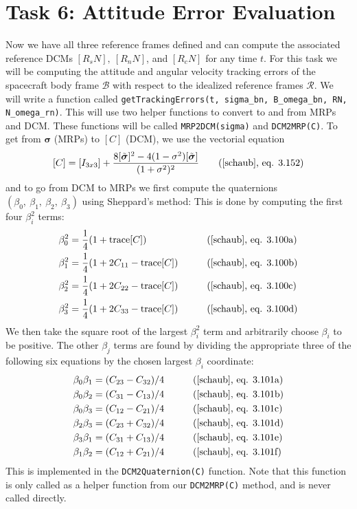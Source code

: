 \documentclass[conf]{new-aiaa}
\begin{document}
\section{Task 6: Attitude Error Evaluation}
Now we have all three reference frames defined and can compute the associated reference DCMs $[R_sN],\ [R_nN]$, and $[R_cN]$ for any time $t$. For this task we will be computing the attitude and angular velocity tracking errors of the spacecraft body frame $\mathcal{B}$ with respect to the idealized reference frames $\mathcal{R}$.
We will write a function called \texttt{getTrackingErrors(t, sigma\_bn, B\_omega\_bn, RN, N\_omega\_rn)}. This will use two helper functions to convert to and from MRPs and DCM. These functions will be called \texttt{MRP2DCM(sigma)} and \texttt{DCM2MRP(C)}. To get from $\bm{\sigma}$ (MRPs) to $[C]$ (DCM), we use the vectorial equation
\[
[C]= [I_{3x3}] + \frac{8[\tilde{\bm{\sigma}}]^2-4(1-\sigma^2)[\tilde{\bm{\sigma}}]}{(1+\sigma^2)^2}
\tag{\cite{schaub},~eq. 3.152}\]
and to go from DCM to MRPs we first compute the quaternions $(\beta_0,\ \beta_1,\ \beta_2,\ \beta_3)$ using Sheppard's method: This is done by computing the first four $\beta_i^2$ terms:
\begin{align}
\beta_0^2 &= \frac{1}{4}(1+\text{trace}[C]) && \tag{\cite{schaub},~eq. 3.100a} \\
\beta_1^2 &= \frac{1}{4}(1+2C_{11}-\text{trace}[C]) && \tag{\cite{schaub},~eq. 3.100b} \\
\beta_2^2 &= \frac{1}{4}(1+2C_{22}-\text{trace}[C]) && \tag{\cite{schaub},~eq. 3.100c} \\
\beta_3^2 &= \frac{1}{4}(1+2C_{33}-\text{trace}[C]) && \tag{\cite{schaub},~eq. 3.100d}
\end{align}
We then take the square root of the largest $\beta_i^2$ term and arbitrarily choose $\beta_i$ to be positive. The other $\beta_j$ terms are found by dividing the appropriate three of the following six equations by the chosen largest $\beta_i$ coordinate:
\begin{align}
\beta_0\beta_1 &= (C_{23}-C_{32})/4 && \tag{\cite{schaub},~eq. 3.101a} \\
\beta_0\beta_2 &= (C_{31}-C_{13})/4 && \tag{\cite{schaub},~eq. 3.101b} \\
\beta_0\beta_3 &= (C_{12}-C_{21})/4 && \tag{\cite{schaub},~eq. 3.101c} \\
\beta_2\beta_3 &= (C_{23}+C_{32})/4 && \tag{\cite{schaub},~eq. 3.101d} \\
\beta_3\beta_1 &= (C_{31}+C_{13})/4 && \tag{\cite{schaub},~eq. 3.101e} \\
\beta_1\beta_2 &= (C_{12}+C_{21})/4 && \tag{\cite{schaub},~eq. 3.101f}
\end{align}
This is implemented in the \texttt{DCM2Quaternion(C)} function. Note that this function is only called as a helper function from our \texttt{DCM2MRP(C)} method, and is never called directly.
\end{document}
